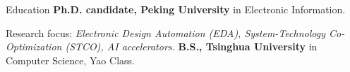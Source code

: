\begin{rubric}{Education}
\entry*[2024 -- present]%
	\textbf{Ph.D. candidate, Peking University} in Electronic Information.
	\par Research focus: \emph{Electronic Design Automation (EDA), System-Technology Co-Optimization (STCO), AI accelerators.}
%
\entry*[2020 -- 2024]%
	\textbf{B.S., Tsinghua University} in Computer Science, Yao Class.
\end{rubric}
